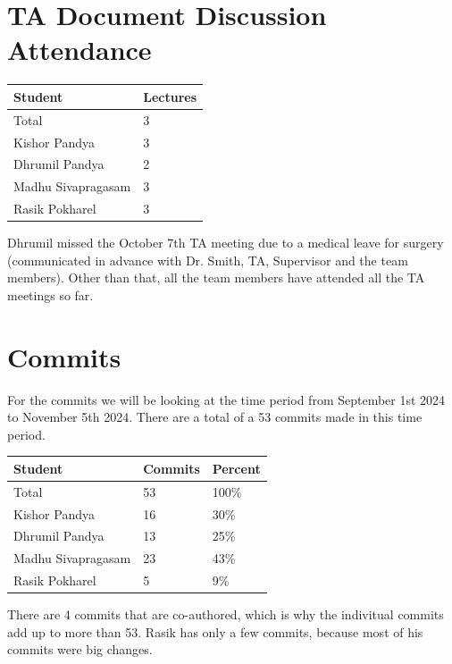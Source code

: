 \documentclass{article}
\begin{document}
\section{TA Document Discussion Attendance}

\begin{table}[H]
\centering
\begin{tabular}{ll}
\toprule
\textbf{Student} & \textbf{Lectures}\\
\midrule
Total & 3\\
Kishor Pandya & 3\\
Dhrumil Pandya & 2\\
Madhu Sivapragasam & 3\\
Rasik Pokharel & 3\\
\bottomrule
\end{tabular}
\end{table}

Dhrumil missed the October 7th TA meeting due to a medical leave for surgery (communicated in advance with Dr. Smith, TA, Supervisor and the team members). Other than that, all the team members have attended all the TA meetings so far.

\section{Commits}

For the commits we will be looking at the time period from September 1st 2024 to November 5th 2024. There are a total of a 53 commits made in this time period.\\

\begin{table}[H]
\centering
\begin{tabular}{lll}
\toprule
\textbf{Student} & \textbf{Commits} & \textbf{Percent}\\
\midrule
Total & 53 & 100\% \\
Kishor Pandya & 16 & 30\% \\
Dhrumil Pandya & 13 & 25\% \\
Madhu Sivapragasam & 23 & 43\% \\
Rasik Pokharel & 5 & 9\% \\
\bottomrule
\end{tabular}
\end{table}

There are 4 commits that are co-authored, which is why the indivitual commits add up to more than 53. Rasik has only a few commits, because most of his commits were big changes.
\end{document}
